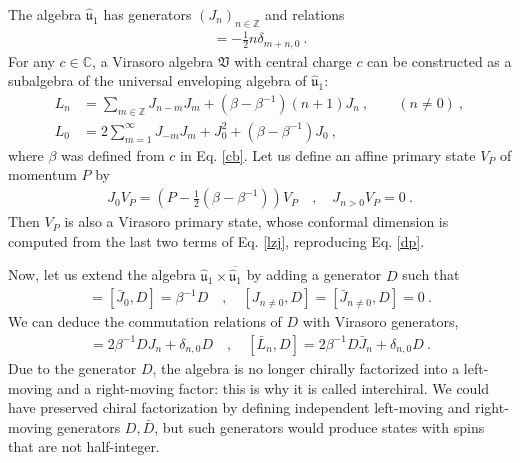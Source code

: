 \documentclass[12pt, a4paper]{article}
\theoremstyle{break}
\begin{document}
The algebra $\hat{\mathfrak{u}}_1$ has generators $(J_n)_{n\in\mathbb{Z}}$ and relations 
\begin{align}
 [J_m,J_n] = -\frac12 n\delta_{m+n,0}\ . 
\end{align}
For any $c\in\mathbb{C}$, a Virasoro algebra $\mathfrak{V}$ with central charge $c$ can be constructed as a subalgebra of the universal enveloping algebra of $\hat{\mathfrak{u}}_1$:
\begin{align}
 L_n &= \sum_{m\in{\mathbb{Z}}} J_{n-m}J_m + \left(\beta-\beta^{-1}\right)(n+1)J_n\ , \qquad (n\neq 0)\ ,
\label{lnj}
\\
L_0 &=2\sum_{m=1}^\infty J_{-m}J_m +J_0^2+\left(\beta-\beta^{-1}\right)J_0 \ ,
\label{lzj}
\end{align}
where $\beta$ was defined from $c$ in Eq. \eqref{cb}. Let us define an affine primary state $V_P$ of momentum $P$ by 
\begin{align}
 J_0 V_P  = \left(P-\tfrac12\left(\beta-\beta^{-1}\right) \right) V_P \quad , \quad J_{n>0} V_P = 0\ .
\end{align}
Then $V_P$ is also a Virasoro primary state, whose conformal dimension is computed from the last two terms of Eq. \eqref{lzj}, reproducing Eq. \eqref{dp}. 

Now, let us extend the algebra $\hat{\mathfrak{u}}_1\times \overline{\hat{\mathfrak{u}}_1}$ by adding a generator $D$ such that 
\begin{align}
 [J_0,D] = [\bar J_0,D] = \beta^{-1}D \quad , \quad [J_{n\neq 0},D]=[\bar J_{n\neq 0},D]=0 \ .
\end{align}
We can deduce the commutation relations of $D$ with Virasoro generators,
\begin{align}
 [L_n,D] =2\beta^{-1}DJ_n +\delta_{n,0}D \quad , \quad [\bar L_n,D] =2\beta^{-1}D\bar J_n +\delta_{n,0}D\ .
\end{align}
Due to the generator $D$, the algebra is no longer chirally factorized into a left-moving and a right-moving factor: this is why it is called interchiral. We could have preserved chiral factorization by defining independent left-moving and right-moving generators $D,\bar D$, but such generators would produce states with spins that are not half-integer. 
\end{document}
